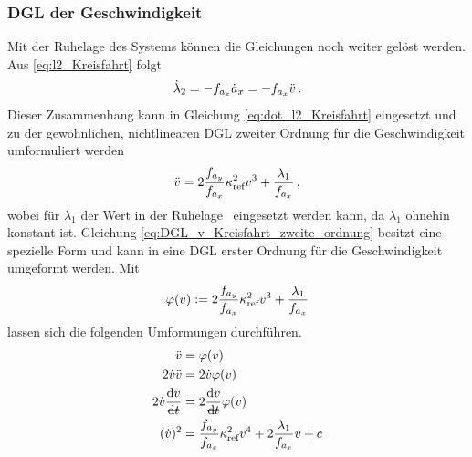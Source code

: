 \subsubsection{\gls{DGL} der Geschwindigkeit}
Mit der Ruhelage des Systems können die Gleichungen noch weiter gelöst werden. Aus \eqref{eq:l2_Kreisfahrt} folgt 
\begin{equation}
\dot{\lambda}_2 = -f_{a_x} \dot{a}_x = -f_{a_x} \ddot{v}\,. 
\end{equation}
Dieser Zusammenhang kann in Gleichung \eqref{eq:dot_l2_Kreisfahrt} eingesetzt und zu der gewöhnlichen, nichtlinearen \gls{DGL} zweiter Ordnung für die Geschwindigkeit umformuliert werden
\begin{equation}
\ddot{v} = 2\frac{f_{a_y}}{f_{a_x}}\kappa_{\textrm{ref}}^2v^3+\frac{\lambda_1}{f_{a_x}}\,, \label{eq:DGL_v_Kreisfahrt_zweite_ordnung}
\end{equation}
wobei für $\lambda_1$ der Wert in der Ruhelage \loneRL~eingesetzt werden kann, da $\lambda_1$ ohnehin konstant ist. Gleichung \eqref{eq:DGL_v_Kreisfahrt_zweite_ordnung} besitzt eine spezielle Form und kann in eine \gls{DGL} erster Ordnung für die Geschwindigkeit umgeformt werden. Mit 
\begin{equation}
	\varphi(v) := 2\frac{f_{a_y}}{f_{a_x}}\kappa_{\textrm{ref}}^2v^3+\frac{\lambda_1}{f_{a_x}}
\end{equation}
lassen sich die folgenden Umformungen durchführen.
\begin{align}
	\ddot{v} &= \varphi(v) \\
	2\dot{v} \ddot{v} &= 2\dot{v}\varphi(v)\\
	2\dot{v} \frac{\textrm{d}\dot{v}}{\stkout{\textrm{d}t}} &= 2\frac{\textrm{d}v}{\stkout{\textrm{d}t}}\varphi(v)\\
	(\dot{v})^2 &= \frac{\fay}{\fax}\kapparef^2v^4+2\frac{\lambda_1}{\fax}v + c \label{eq:DGL_v_Kreisfahrt_erste_ordnung}
\end{align}
